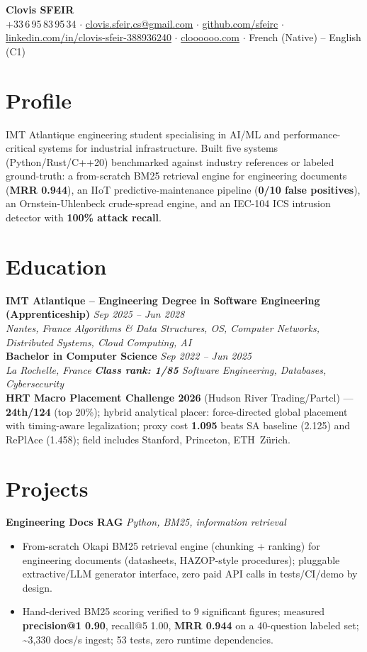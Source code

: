 \documentclass[10pt]{article}
\newcommand{\entry}[4]{%
  \noindent\textbf{#1} \hfill \textit{#2} \\
  \textit{#3} \hfill \textit{#4}\\[-0.3em]
}
\newcommand{\projectentry}[2]{%
  \noindent\textbf{#1} \hfill \textit{#2}\\[-0.3em]
}
\begin{document}
\fontsize{9.3pt}{11pt}\selectfont
\begin{center}
  {\LARGE \textbf{Clovis SFEIR}}\\[0.3em]
  +33\,6\,95\,83\,95\,34 \;$\cdot$\; \href{mailto:clovis.sfeir.cs@gmail.com}{clovis.sfeir.cs@gmail.com} \;$\cdot$\;
  \href{https://github.com/sfeirc}{github.com/sfeirc} \;$\cdot$\;
  \href{https://linkedin.com/in/clovis-sfeir-388936240}{linkedin.com/in/clovis-sfeir-388936240} \;$\cdot$\;
  \href{https://cloooooo.com}{cloooooo.com} \;$\cdot$\; French (Native) -- English (C1)
\end{center}

\section*{Profile}
IMT Atlantique engineering student specialising in AI/ML and performance-critical systems for industrial infrastructure. Built five systems (Python/Rust/C++20) benchmarked against industry references or labeled ground-truth: a from-scratch BM25 retrieval engine for engineering documents (\textbf{MRR 0.944}), an IIoT predictive-maintenance pipeline (\textbf{0/10 false positives}), an Ornstein-Uhlenbeck crude-spread engine, and an IEC-104 ICS intrusion detector with \textbf{100\% attack recall}.

\section*{Education}
\entry{IMT Atlantique -- Engineering Degree in Software Engineering (Apprenticeship)}{Sep 2025 -- Jun 2028}{Nantes, France}{Algorithms \& Data Structures, OS, Computer Networks, Distributed Systems, Cloud Computing, AI}
\entry{Bachelor in Computer Science}{Sep 2022 -- Jun 2025}{La Rochelle, France}{\textbf{Class rank: 1/85} \textbar{} Software Engineering, Databases, Cybersecurity}
\noindent\textbf{HRT Macro Placement Challenge 2026} (Hudson River Trading/Partcl) --- \textbf{24th/124} (top 20\%); hybrid analytical placer: force-directed global placement with timing-aware legalization; proxy cost \textbf{1.095} beats SA baseline (2.125) and RePlAce (1.458); field includes Stanford, Princeton, ETH~Z\"urich.

\section*{Projects}

\projectentry{Engineering Docs RAG}{Python, BM25, information retrieval}
\begin{itemize}
  \item From-scratch Okapi BM25 retrieval engine (chunking + ranking) for engineering documents (datasheets, HAZOP-style procedures); pluggable extractive/LLM generator interface, zero paid API calls in tests/CI/demo by design.
  \item Hand-derived BM25 scoring verified to 9 significant figures; measured \textbf{precision@1 0.90}, recall@5 1.00, \textbf{MRR 0.944} on a 40-question labeled set; \textasciitilde3{,}330 docs/s ingest; 53 tests, zero runtime dependencies.
\end{itemize}
\end{document}
